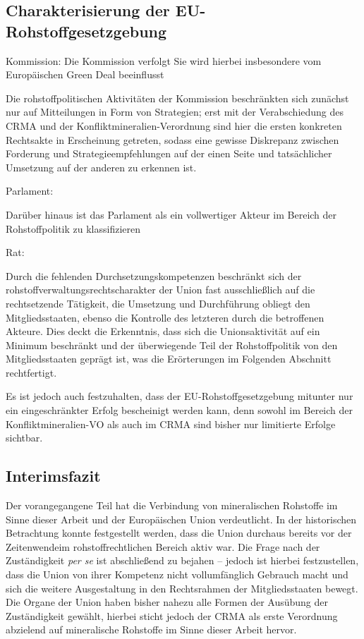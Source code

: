 \documentclass[12pt,a4paper,oneside]{book} %
\begin{document}
\subsection{Charakterisierung der EU-Rohstoffgesetzgebung}

Kommission: Die Kommission verfolgt 
Sie wird hierbei insbesondere vom Europäischen Green Deal beeinflusst

Die rohstoffpolitischen Aktivitäten der Kommission beschränkten sich zunächst nur auf Mitteilungen in Form von Strategien; erst mit der Verabschiedung des CRMA und der Konfliktmineralien-Verordnung sind hier die ersten konkreten Rechtsakte in Erscheinung getreten, sodass eine gewisse Diskrepanz zwischen Forderung und Strategieempfehlungen auf der einen Seite und tatsächlicher Umsetzung auf der anderen zu erkennen ist.

Parlament: 

Darüber hinaus ist das Parlament als ein vollwertiger Akteur im Bereich der Rohstoffpolitik zu klassifizieren

Rat:



Durch die fehlenden Durchsetzungskompetenzen beschränkt sich der rohstoffverwaltungsrechtscharakter der Union fast ausschließlich auf die rechtsetzende Tätigkeit, die Umsetzung und Durchführung obliegt den Mitgliedsstaaten, ebenso die Kontrolle des letzteren durch die betroffenen Akteure. Dies deckt die Erkenntnis, dass sich die Unionsaktivität auf ein Minimum beschränkt und der überwiegende Teil der Rohstoffpolitik von den Mitgliedsstaaten geprägt ist, was die Erörterungen im Folgenden Abschnitt rechtfertigt.

Es ist jedoch auch festzuhalten, dass der EU-Rohstoffgesetzgebung mitunter nur ein eingeschränkter Erfolg bescheinigt werden kann, denn sowohl im Bereich der Konfliktmineralien-VO als auch im CRMA sind bisher nur limitierte Erfolge sichtbar.


\subsection{Interimsfazit}
Der vorangegangene Teil hat die Verbindung von mineralischen Rohstoffe im Sinne dieser Arbeit und der Europäischen Union verdeutlicht. In der historischen Betrachtung konnte festgestellt werden, dass die Union durchaus bereits vor der \glqq Zeitenwende\grqq im rohstoffrechtlichen Bereich aktiv war.
Die Frage nach der Zuständigkeit \textit{per se} ist abschließend zu bejahen -- jedoch ist hierbei festzustellen, dass die Union von ihrer Kompetenz nicht vollumfänglich Gebrauch macht und sich die weitere Ausgestaltung in den Rechtsrahmen der Mitgliedsstaaten bewegt.
Die Organe der Union haben bisher nahezu alle Formen der Ausübung der Zuständigkeit gewählt, hierbei sticht jedoch der CRMA als erste Verordnung abzielend auf mineralische Rohstoffe im Sinne dieser Arbeit hervor.
\end{document}
